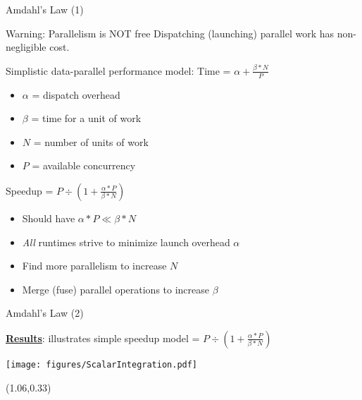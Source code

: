 \iffull
\begin{frame}[fragile]{Amdahl's Law (1)}

  \vspace{-10pt}
  \begin{alertblock}{Warning: Parallelism is NOT free}
    Dispatching (launching) parallel work has non-negligible cost.
  \end{alertblock}

  \pause

  {Simplistic data-parallel performance model: Time = $ \alpha + \frac{\beta * N}{P} $}
  \begin{itemize}
  \item {$\alpha$ = dispatch overhead}
  \item {$\beta$ = time for a unit of work}
  \item {$N$ = number of units of work}
  \item {$P$ = available concurrency}
  \end{itemize}

  \pause

  Speedup = {$P \div {\left( 1 + \frac{\alpha * P}{\beta * N} \right)}$}
  \begin{itemize}
  \item Should have {$\alpha * P \ll \beta * N$}
  \item \textit{All} runtimes strive to minimize launch overhead $\alpha$
  \item Find more parallelism to increase $N$
  \item Merge (fuse) parallel operations to increase $\beta$
  \end{itemize}

  \vspace{-10pt}

\end{frame}
\fi


\iffull
\begin{frame}[fragile]{Amdahl's Law (2)}

  \vspace{12pt}

  \textbf{\ul{Results}}:
  {illustrates simple speedup model = {$P \div {\left( 1 + \frac{\alpha * P}{\beta * N} \right)}$}}

  \vspace{-32pt}

  \begin{center}
    \texttt{[image: figures/ScalarIntegration.pdf]}
  \end{center}

  \vspace{-24pt}

  \begin{textblock*}{0.5\textwidth}(1.06\textwidth,0.33\textheight)
  \end{textblock*}

\end{frame}
\fi

